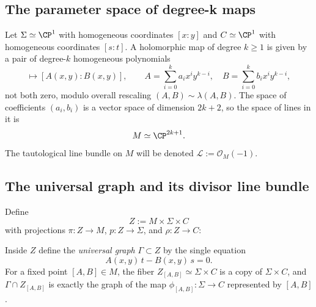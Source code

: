 \documentclass[12pt]{article}
\begin{document}
\subsection{The parameter space of degree-k maps}
Let $\Sigma\simeq\CP^1$ with homogeneous coordinates $[x:y]$ and
$C\simeq\CP^1$ with homogeneous coordinates $[s:t]$. A holomorphic map of
degree $k\ge 1$ is given by a pair of degree-$k$ homogeneous polynomials
\begin{equation*}
  [x:y]\longmapsto [A(x,y):B(x,y)],
  \qquad
  A=\sum_{i=0}^k a_i x^i y^{k-i},\quad
  B=\sum_{i=0}^k b_i x^i y^{k-i},
\end{equation*}
not both zero, modulo overall rescaling $(A,B)\sim\lambda(A,B)$. The space of
coefficients $(a_i,b_i)$ is a vector space of dimension $2k+2$, so the space of
lines in it is
\begin{equation*}
  M\simeq\CP^{2k+1}.
\end{equation*}
The tautological line bundle on $M$ will be denoted $\mathcal{L}:=\mathcal{O}_M(-1)$.

\subsection{The universal graph and its divisor line bundle}
Define
\begin{equation*}
  Z := M\times \Sigma\times C
\end{equation*}
with projections $\pi:Z\to M$, $p:Z\to\Sigma$, and $\rho:Z\to C$:
\begin{center}
\end{center}
Inside $Z$ define the \emph{universal graph} $\Gamma\subset Z$ by the single
equation
\begin{equation*}
  A(x,y)\,t - B(x,y)\,s = 0.
\end{equation*}
For a fixed point $[A,B]\in M$, the fiber $Z_{[A,B]}\simeq\Sigma\times C$ is a
copy of $\Sigma\times C$, and $\Gamma\cap Z_{[A,B]}$ is exactly the graph of
the map $\phi_{[A,B]}:\Sigma\to C$ represented by $[A,B]$.
\begin{center}
\end{center}
\end{document}
